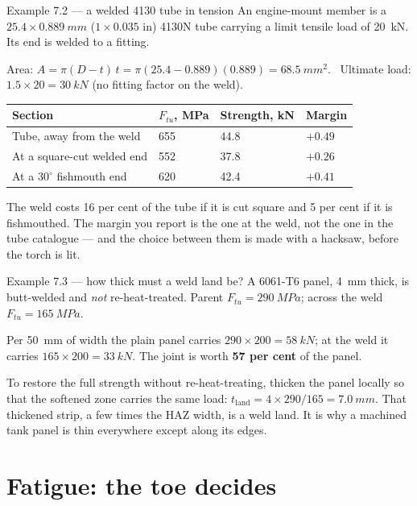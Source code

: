 \documentclass[11pt,a4paper]{article}
\begin{document}
\begin{examplebox}{Example 7.2 --- a welded 4130 tube in tension}
An engine-mount member is a $25.4\times\SI{0.889}{mm}$ ($1\times0.035$ in) 4130N tube carrying a
limit tensile load of \SI{20}{kN}. Its end is welded to a fitting.

\medskip
Area: $A=\pi(D-t)\,t=\pi(25.4-0.889)(0.889)=\SI{68.5}{mm^2}$. \ Ultimate load: $1.5\times20=
\SI{30}{kN}$ (no fitting factor on the weld).

\begin{center}\small
\begin{tabular}{@{}llll@{}}
\toprule
Section & $F_{tu}$, MPa & Strength, kN & Margin\\
\midrule
Tube, away from the weld & 655 & 44.8 & $+0.49$\\
At a square-cut welded end & 552 & 37.8 & $\mathbf{+0.26}$\\
At a $30^\circ$ fishmouth end & 620 & 42.4 & $+0.41$\\
\bottomrule
\end{tabular}
\end{center}

The weld costs 16 per cent of the tube if it is cut square and 5 per cent if it is fishmouthed. The
margin you report is the one at the weld, not the one in the tube catalogue --- and the choice
between them is made with a hacksaw, before the torch is lit.
\end{examplebox}

\begin{examplebox}{Example 7.3 --- how thick must a weld land be?}
A 6061-T6 panel, \SI{4}{mm} thick, is butt-welded and \emph{not} re-heat-treated. Parent
$F_{tu}=\SI{290}{MPa}$; across the weld $F_{tu}=\SI{165}{MPa}$.

\medskip
Per \SI{50}{mm} of width the plain panel carries $290\times200=\SI{58}{kN}$; at the weld it carries
$165\times200=\SI{33}{kN}$. The joint is worth \textbf{57 per cent} of the panel.

\medskip
To restore the full strength without re-heat-treating, thicken the panel locally so that the
softened zone carries the same load: $t_{\text{land}}=4\times290/165=\SI{7.0}{mm}$. That thickened
strip, a few times the HAZ width, is a weld land. It is why a machined tank panel is thin
everywhere except along its edges.
\end{examplebox}

\section{Fatigue: the toe decides}
\label{sec:fatigue}
\end{document}

